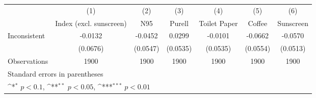 {
\def\sym#1{\ifmmode^{#1}\else\(^{#1}\)\fi}
\begin{tabular}{l*{6}{c}}
\hline\hline
                    &\multicolumn{1}{c}{(1)}         &\multicolumn{1}{c}{(2)}         &\multicolumn{1}{c}{(3)}         &\multicolumn{1}{c}{(4)}         &\multicolumn{1}{c}{(5)}         &\multicolumn{1}{c}{(6)}         \\
                    &Index (excl. sunscreen)         &         N95         &      Purell         &Toilet Paper         &      Coffee         &   Sunscreen         \\
\hline
Inconsistent        &     -0.0132         &     -0.0452         &      0.0299         &     -0.0101         &     -0.0662         &     -0.0570         \\
                    &    (0.0676)         &    (0.0547)         &    (0.0535)         &    (0.0535)         &    (0.0554)         &    (0.0513)         \\
\hline
Observations        &        1900         &        1900         &        1900         &        1900         &        1900         &        1900         \\
\hline\hline
\multicolumn{7}{l}{\footnotesize Standard errors in parentheses}\\
\multicolumn{7}{l}{\footnotesize \sym{*} \(p<0.1\), \sym{**} \(p<0.05\), \sym{***} \(p<0.01\)}\\
\end{tabular}
}
